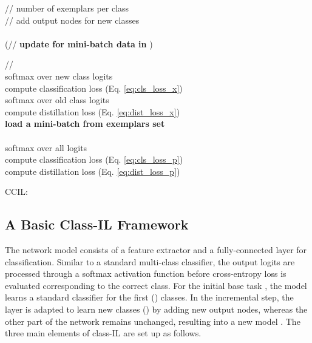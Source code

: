 \documentclass[final]{cvpr}
\begin{document}
\begin{algorithm}[!b]
\SetAlgoLined
\DontPrintSemicolon
\Indentp{0.5em}
\Indm
{}
\Indp
 \hspace{0.2cm} // number of exemplars per class\\
  \hspace{0.2cm} // add output nodes for new classes \\
  \label{alg1:new_exem} \\


\For(\hspace{100px}// {\textbf{update for mini-batch data in} } ){}{  \label{alg1:intra_task_start}

  \hspace{1cm}  // \\   
softmax over new class logits   \\
compute classification loss  (Eq. \ref{eq:cls_loss_x}) \\
softmax over old class logits   \\
compute distillation loss   (Eq. \ref{eq:dist_loss_x})\\
 \label{alg1:intra_task_end}
\BlankLine
 \textbf{load a mini-batch from exemplars set}   \label{alg1:inter_task_start} \\
    \\
softmax over all logits   \label{alg1:comb_sigma}  \\
compute classification loss  (Eq. \ref{eq:cls_loss_p}) \\
compute distillation loss  (Eq. \ref{eq:dist_loss_p}) \\
\BlankLine
 \label{alg1:final_loss}
}
\caption{CCIL: } \label{alg1}
\end{algorithm}




\subsection{A Basic Class-IL Framework}
The network model  consists of a feature extractor  and a fully-connected layer  for classification. Similar to a standard multi-class classifier, the output logits  are processed through a softmax activation function  before cross-entropy loss  is evaluated corresponding to the correct class.
For the initial base task , the model  learns a standard classifier for the first () classes. 
In the incremental step, the  layer is adapted to learn new classes () by adding new output nodes, whereas the other part of the network remains unchanged, resulting into a new model . The three main elements of class-IL are set up as follows. 
\end{document}
